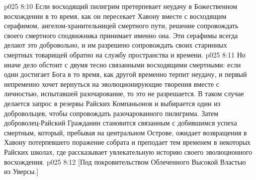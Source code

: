 \vs p025 8:10 Если восходящий пилигрим претерпевает неудачу в Божественном восхождении в то время, как он пересекает Хавону вместе с восходящим серафимом, ангелом\hyp{}хранительницей смертного пути, решение сопровождать своего смертного сподвижника принимает именно она. Эти серафимы всегда делают это добровольно, и им разрешено сопровождать своих старинных смертных товарищей обратно на службу пространства и времени.
\vs p025 8:11 Но иначе дело обстоит с двумя тесно связанными восходящими смертными: если один достигает Бога в то время, как другой временно терпит неудачу, и первый непременно хочет вернуться на эволюционирующие творения вместе с личностью, испытавшей разочарование, то это не разрешается. В таком случае делается запрос в резервы Райских Компаньонов и выбирается один из добровольцев, чтобы сопровождать разочарованного пилигрима. Затем доброволец\hyp{}Райский Гражданин становится связанным с добившимся успеха смертным, который, пребывая на центральном Острове, ожидает возвращения в Хавону потерпевшего поражение собрата и преподает тем временем в некоторых Райских школах, где рассказывает увлекательную историю своего эволюционного восхождения.
\vs p025 8:12 [Под покровительством Облеченного Высокой Властью из Уверсы.]
